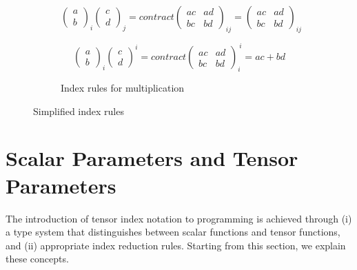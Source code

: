 \begin{figure}
\begin{minipage}[t]{0.5\columnwidth}
\begin{subfigure}[h]{1.0\textwidth}
\begin{center}
\[\begin{pmatrix}
a \\
b
\end{pmatrix}_{i}
\begin{pmatrix}
c \\
d
\end{pmatrix}_{j}
=
contract
\begin{pmatrix}
a c & a d \\
b c & b d
\end{pmatrix}_{ij}
=
\begin{pmatrix}
a c & a d \\
b c & b d
\end{pmatrix}_{ij}\]

\[\begin{pmatrix}
a \\
b
\end{pmatrix}_{i}
\begin{pmatrix}
c \\
d
\end{pmatrix}^{i}
=
contract
\begin{pmatrix}
a c & a d \\
b c & b d
\end{pmatrix}_{i}^{\ i}
= a c + b d\]
\end{center}
\caption{Index rules for multiplication}
\label{fig:ruleMult}
\end{subfigure}
\end{minipage}
\caption{Simplified index rules}
\label{fig:rule}
\end{figure}

\section{Scalar Parameters and Tensor Parameters}\label{tensor-params}

The introduction of tensor index notation to programming is achieved through (i) a type system that distinguishes between scalar functions and tensor functions, and (ii) appropriate index reduction rules.
Starting from this section, we explain these concepts.

